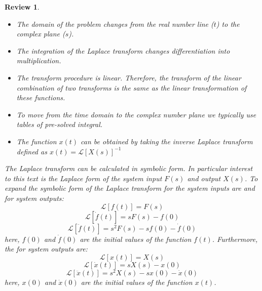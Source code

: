 \documentclass[12pt,letter]{article}
\numberwithin{ex}{section} %
\newtheorem{re}{Review}
\numberwithin{re}{section} %
\newenvironment{review}{\begin{mdframed}[middlelinewidth=2mm,roundcorner=20pt]\begin{re}\normalfont}{\end{re}\end{mdframed}}
\newcommand{\Laplace}[1]{\ensuremath{\mathcal{L}{\left[#1\right]}}}
\begin{document}
\begin{review}
		\begin{itemize}
			\item The domain of the problem changes from the real number line ($t$) to the complex plane ($s$).
			\item The integration of the Laplace transform changes differentiation into multiplication.
			\item The transform procedure is linear. Therefore, the transform of the linear combination of two transforms is the same as the linear transformation of these functions. 
			\item To move from the time domain to the complex number plane we typically use tables of pre-solved integral. 
			\item The function $x(t)$ can be obtained by taking the inverse Laplace transform defined as $x(t) = \Laplace{X(s)}^{-1}$
		\end{itemize}

			The Laplace transform can be calculated in symbolic form. In particular interest to this text is the Laplace form of the system input $F(s)$ and output $X(s)$. To expand the symbolic form of the Laplace transform for the system inputs are 
			and for system outputs:
			\begin{equation}
				\label{eq:laplace_f}
				\Laplace{f(t)} = F(s)
			\end{equation}		
			\begin{equation}
				\label{eq:laplace_f'}
				\Laplace{\dot{f}(t)} = sF(s)-f(0)
			\end{equation}	
			\begin{equation}
				\label{eq:laplace_f''}
				\Laplace{\ddot{f}(t)} = s^2F(s)-sf(0) - \dot{f}(0)
			\end{equation}	
			here, $f(0)$ and $\dot{f}(0)$ are the initial values of the function $f(t)$.  Furthermore, the for system outputs are:
			\begin{equation}
				\label{eq:laplace_x}
				\Laplace{x(t)} = X(s)
			\end{equation}		
			\begin{equation}
				\label{eq:laplace_x'}
				\Laplace{\dot{x}(t)} = sX(s)-x(0)
			\end{equation}	
			\begin{equation}
				\label{eq:laplace_x''}
				\Laplace{\ddot{x}(t)} = s^2X(s)-sx(0) - \dot{x}(0)
			\end{equation}	
			here, $x(0)$ and $\dot{x}(0)$ are the initial values of the function $x(t)$. 		
	
\end{review}
\end{document}
